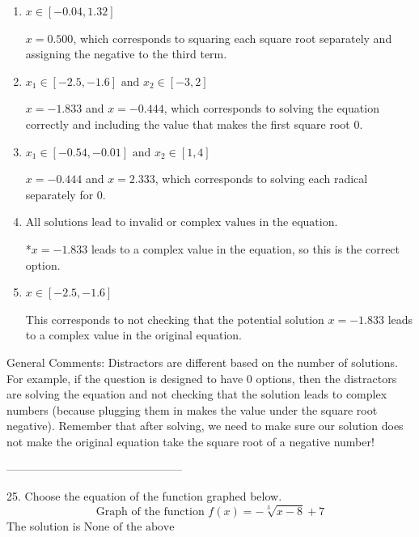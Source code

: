 \documentclass{article}[14pt]
\begin{document}
\begin{enumerate}[label=\Alph*.] 
\item $ x \in [-0.04,1.32] $ 

 $x = 0.500$, which corresponds to squaring each square root separately and assigning the negative to the third term. 
\item $ x_1 \in [-2.5, -1.6] \text{ and } x_2 \in [-3,2] $ 

 $x = -1.833$ and $x = -0.444$, which corresponds to solving the equation correctly and including the value that makes the first square root 0. 
\item $ x_1 \in [-0.54, -0.01] \text{ and } x_2 \in [1,4] $ 

 $x = -0.444$ and $x = 2.333$, which corresponds to solving each radical separately for 0. 
\item $ \text{All solutions lead to invalid or complex values in the equation.} $ 

 *$x = -1.833$ leads to a complex value in the equation, so this is the correct option. 
\item $ x \in [-2.5,-1.6] $ 

 This corresponds to not checking that the potential solution $x = -1.833$ leads to a complex value in the original equation. 
\end{enumerate} 
 
General Comments: Distractors are different based on the number of solutions. For example, if the question is designed to have 0 options, then the distractors are solving the equation and not checking that the solution leads to complex numbers (because plugging them in makes the value under the square root negative). Remember that after solving, we need to make sure our solution does not make the original equation take the square root of a negative number!

-----------------------------------------------

25. Choose the equation of the function graphed below.
$$ \text{Graph of the function } f(x) = - \sqrt[3]{x - 8} + 7 $$ 
The solution is $ \text{None of the above} $ 
\end{document}
